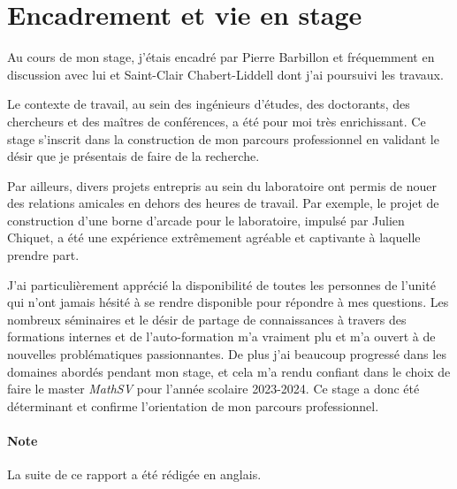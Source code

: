 \section{Encadrement et vie en stage}

Au cours de mon stage, j'étais encadré par Pierre Barbillon et fréquemment en
discussion avec lui et Saint-Clair Chabert-Liddell dont j'ai poursuivi les
travaux.

Le contexte de travail, au sein des ingénieurs d'études, des doctorants, des
chercheurs et des maîtres de conférences, a été pour moi très enrichissant. Ce
stage s'inscrit dans la construction de mon parcours professionnel en validant
le désir que je présentais de faire de la recherche.

Par ailleurs, divers projets entrepris au sein du laboratoire ont permis de
nouer des relations amicales en dehors des heures de travail. Par exemple, le
projet de construction d'une borne d'arcade pour le laboratoire, impulsé par
Julien Chiquet, a été une expérience extrêmement agréable et captivante à
laquelle prendre part.

J'ai particulièrement apprécié la disponibilité de toutes les personnes de
l'unité qui n'ont jamais hésité à se rendre disponible pour répondre à mes
questions.
Les nombreux séminaires et le désir de partage de connaissances à travers des
formations internes et de l'auto-formation m'a vraiment plu et m'a ouvert à de
nouvelles problématiques passionnantes.
De plus j'ai beaucoup progressé dans les domaines abordés pendant mon
stage, et cela m'a rendu confiant dans le choix de faire le
master \emph{MathSV} pour l'année scolaire 2023-2024. Ce stage a donc été
déterminant et confirme l'orientation de mon parcours professionnel.

\paragraph*{Note} La suite de ce rapport a été rédigée en anglais.